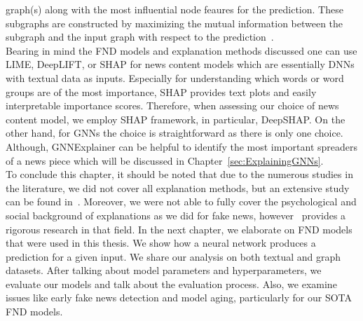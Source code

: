 graph(s) along with the most influential node feaures for the prediction. These subgraphs are constructed by maximizing the mutual information between the subgraph and the input graph with respect to the
prediction~\parencite{GNNExplainer_Ying}.\\
Bearing in mind the FND models and explanation methods discussed one can use LIME, DeepLIFT, or SHAP for news content models which are essentially DNNs with textual data as inputs. Especially for understanding which words or word groups are of the most importance, SHAP provides text plots and easily interpretable importance scores. Therefore, when assessing our choice of news content model, we employ SHAP framework, in particular, DeepSHAP. On the other hand, for GNNs the choice is straightforward as there is only one choice. Although, GNNExplainer can be helpful to identify the most important spreaders of a news piece which will be discussed in Chapter~\ref{sec:ExplainingGNNs}.\\
To conclude this chapter, it should be noted that due to the numerous studies in the literature, we did not cover all explanation methods, but an extensive study can be found in~\parencite{InterpretableMachineLearning_Molnar}. Moreover, we were not able to fully cover the psychological and social background of explanations as we did for fake news, however~\cite{ExplanationInAI_Miller} provides a rigorous research in that field. In the next chapter, we elaborate on FND models that were used in this thesis. We show how a neural network produces a prediction for a given input. We share our analysis on both textual and graph datasets. After talking about model parameters and hyperparameters, we evaluate our models and talk about the evaluation process. Also, we examine issues like early fake news detection and model aging, particularly for our SOTA FND models.
